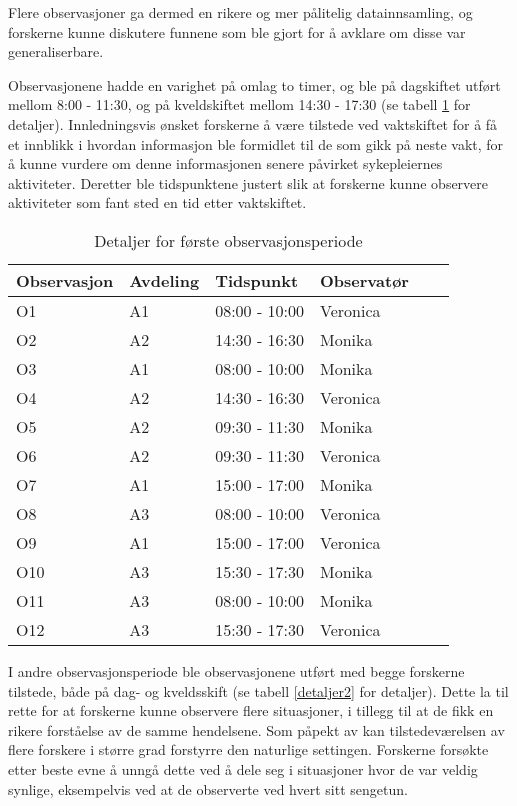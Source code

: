 \noindent
Flere observasjoner ga dermed en rikere og mer pålitelig datainnsamling, og forskerne kunne diskutere funnene som ble gjort for å avklare om disse var generaliserbare.

\noindent
Observasjonene hadde en varighet på omlag to timer, og ble på dagskiftet utført mellom 8:00 - 11:30, og på kveldskiftet mellom 14:30 - 17:30 (se tabell \ref{detaljer1} for detaljer).
Innledningsvis ønsket forskerne å være tilstede ved vaktskiftet for å få et innblikk i hvordan informasjon ble formidlet til de som gikk på neste vakt, for å kunne vurdere om denne informasjonen senere påvirket sykepleiernes aktiviteter. Deretter ble tidspunktene justert slik at forskerne kunne observere aktiviteter som fant sted en tid etter vaktskiftet.
 
\begin{table}[H]\centering
    \begin{tabular}{ |l|l|l|l|l|l| }
    \hline
    Observasjon & Avdeling & Tidspunkt & Observatør \\ \hline
       O1 & A1 & 08:00 - 10:00 & Veronica \\ \hline
       O2 & A2 & 14:30 - 16:30 & Monika \\ \hline
      O3 & A1 & 08:00 - 10:00 & Monika \\ \hline
       O4 & A2 & 14:30 - 16:30 & Veronica \\ \hline
         O5 & A2 & 09:30 - 11:30 & Monika \\ \hline
       O6 & A2 & 09:30 - 11:30 & Veronica \\ \hline
      O7 & A1 & 15:00 - 17:00 & Monika \\ \hline
       O8 & A3 & 08:00 - 10:00 & Veronica \\ \hline
       O9 & A1 & 15:00 - 17:00 & Veronica \\ \hline
       O10 & A3 & 15:30 - 17:30 & Monika \\ \hline
      O11 & A3 & 08:00 - 10:00 & Monika \\ \hline
       O12 & A3 & 15:30 - 17:30 & Veronica \\ \hline
    \end{tabular}
    \caption {Detaljer for første observasjonsperiode}
    \label{detaljer1}
\end{table}
 
\noindent
I andre observasjonsperiode ble observasjonene utført med begge forskerne tilstede, både på dag- og kveldsskift (se tabell \ref{detaljer2} for detaljer). Dette la til rette for at forskerne kunne observere flere situasjoner, i tillegg til at de fikk en rikere forståelse av de samme hendelsene.  Som påpekt av \citet{Millen00} kan tilstedeværelsen av flere forskere i større grad forstyrre den naturlige settingen. Forskerne forsøkte etter beste evne å unngå dette ved å dele seg i situasjoner hvor de var veldig synlige, eksempelvis ved at de observerte ved hvert sitt sengetun.
 
